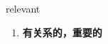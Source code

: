 
\begin{frame}
{\huge relevant}
\begin{center}
\begin{enumerate}\Large
  \item \textbf{有关系的，重要的}
\end{enumerate}
\end{center}
\end{frame}
